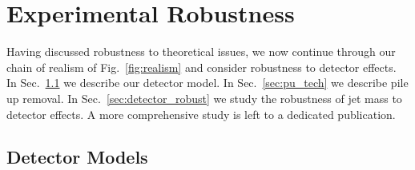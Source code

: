 \documentclass[11pt,letterpaper]{article}
\DeclareRobustCommand{\Sec}[1]{Sec.~\ref{#1}}
\DeclareRobustCommand{\Fig}[1]{Fig.~\ref{#1}}
\begin{document}
\section{Experimental Robustness}\label{sec:exp}

Having discussed robustness to theoretical issues, we now continue through our chain of realism of \Fig{fig:realism} and consider robustness to detector effects.
In \Sec{sec:det_model} we describe our detector model. In \Sec{sec:pu_tech} we describe pile up removal. In \Sec{sec:detector_robust} we study the robustness of jet mass to detector effects. A more comprehensive study is left to a dedicated publication.

\subsection{Detector Models}\label{sec:det_model}
\end{document}
